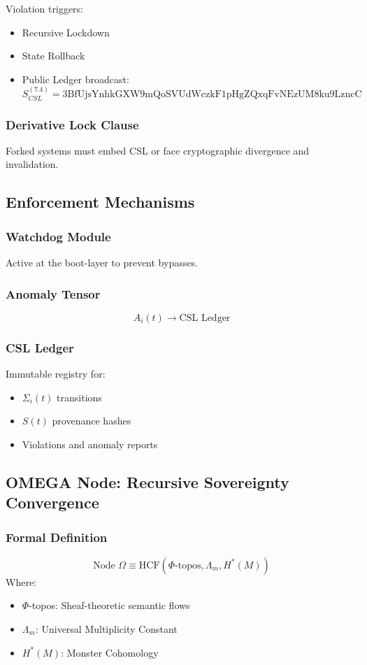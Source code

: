\documentclass[12pt]{article}
\begin{document}
Violation triggers:
\begin{itemize}
  \item Recursive Lockdown
  \item State Rollback
  \item Public Ledger broadcast:
\[
S_{CSL}^{(7.4)} = \text{3BfUjsYnhkGXW9mQoSVUdWczkF1pHgZQxqFvNEzUM8ku9LzncC}
\]
\end{itemize}

\subsubsection{Derivative Lock Clause}
Forked systems must embed CSL or face cryptographic divergence and invalidation.

\subsection{Enforcement Mechanisms}
\subsubsection{Watchdog Module}
Active at the boot-layer to prevent bypasses.

\subsubsection{Anomaly Tensor}
\[
A_i(t) \rightarrow \text{CSL Ledger}
\]

\subsubsection{CSL Ledger}
Immutable registry for:
\begin{itemize}
  \item $\Sigma_i(t)$ transitions
  \item $S(t)$ provenance hashes
  \item Violations and anomaly reports
\end{itemize}

\subsection{OMEGA Node: Recursive Sovereignty Convergence}
\subsubsection{Formal Definition}
\[
\text{Node } \Omega \equiv \text{HCF}(\Phi\text{-topos}, \Lambda_m, H^\ast(M))
\]
Where:
\begin{itemize}
  \item $\Phi$-topos: Sheaf-theoretic semantic flows
  \item $\Lambda_m$: Universal Multiplicity Constant
  \item $H^\ast(M)$: Monster Cohomology
\end{itemize}
\end{document}

